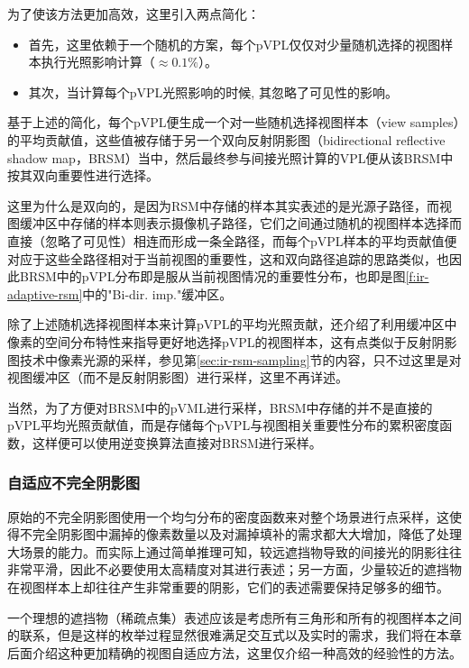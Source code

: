 为了使该方法更加高效，这里引入两点简化：

\begin{itemize}
	\item 首先，这里依赖于一个随机的方案，每个pVPL仅仅对少量随机选择的视图样本执行光照影响计算（$\approx 0.1\%$）。
	\item 其次，当计算每个pVPL光照影响的时候, 其忽略了可见性的影响。
\end{itemize}

基于上述的简化，每个pVPL便生成一个对一些随机选择视图样本（view samples）的平均贡献值，这些值被存储于另一个双向反射阴影图（bidirectional reflective shadow map，BRSM）当中，然后最终参与间接光照计算的VPL便从该BRSM中按其双向重要性进行选择。

这里为什么是双向的，是因为RSM中存储的样本其实表述的是光源子路径，而视图缓冲区中存储的样本则表示摄像机子路径，它们之间通过随机的视图样本选择而直接（忽略了可见性）相连而形成一条全路径，而每个pVPL样本的平均贡献值便对应于这些全路径相对于当前视图的重要性，这和双向路径追踪的思路类似，也因此BRSM中的pVPL分布即是服从当前视图情况的重要性分布，也即是图\ref{f:ir-adaptive-rsm}中的"Bi-dir. imp."缓冲区。

除了上述随机选择视图样本来计算pVPL的平均光照贡献，\cite{a:MakingImperfectShadowMapsViewAdaptive}还介绍了利用缓冲区中像素的空间分布特性来指导更好地选择pVPL的视图样本，这有点类似于反射阴影图技术中像素光源的采样，参见第\ref{sec:ir-rsm-sampling}节的内容，只不过这里是对视图缓冲区（而不是反射阴影图）进行采样，这里不再详述。

当然，为了方便对BRSM中的pVML进行采样，BRSM中存储的并不是直接的pVPL平均光照贡献值，而是存储每个pVPL与视图相关重要性分布的累积密度函数，这样便可以使用逆变换算法直接对BRSM进行采样。





\subsubsection{自适应不完全阴影图}
原始的不完全阴影图使用一个均匀分布的密度函数来对整个场景进行点采样，这使得不完全阴影图中漏掉的像素数量以及对漏掉填补的需求都大大增加，降低了处理大场景的能力。而实际上通过简单推理可知，较远遮挡物导致的间接光的阴影往往非常平滑，因此不必要使用太高精度对其进行表述；另一方面，少量较近的遮挡物在视图样本上却往往产生非常重要的阴影，它们的表述需要保持足够多的细节。

一个理想的遮挡物（稀疏点集）表述应该是考虑所有三角形和所有的视图样本之间的联系，但是这样的枚举过程显然很难满足交互式以及实时的需求，我们将在本章后面介绍这种更加精确的视图自适应方法，这里仅介绍一种高效的经验性的方法。

